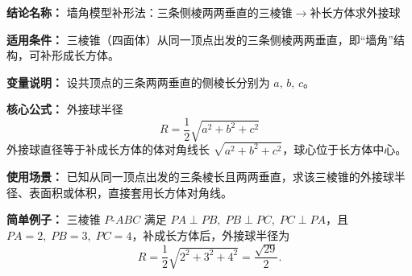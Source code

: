 \textbf{结论名称：} 墙角模型补形法：三条侧棱两两垂直的三棱锥$\rightarrow$补长方体求外接球

\textbf{适用条件：} 三棱锥（四面体）从同一顶点出发的三条侧棱两两垂直，即“墙角”结构，可补形成长方体。

\textbf{变量说明：} 设共顶点的三条两两垂直的侧棱长分别为 $a,\,b,\,c$。

\textbf{核心公式：} 外接球半径
\[
\boxed{R = \frac{1}{2}\sqrt{a^{2}+b^{2}+c^{2}}}
\]
外接球直径等于补成长方体的体对角线长 $\sqrt{a^{2}+b^{2}+c^{2}}$，球心位于长方体中心。

\textbf{使用场景：} 已知从同一顶点出发的三条棱长且两两垂直，求该三棱锥的外接球半径、表面积或体积，直接套用长方体对角线。

\textbf{简单例子：} 三棱锥 $P\text{-}ABC$ 满足 $PA\perp PB,\; PB\perp PC,\; PC\perp PA$，且 $PA=2,\; PB=3,\; PC=4$，补成长方体后，外接球半径为
\[
R = \frac{1}{2}\sqrt{2^{2}+3^{2}+4^{2}} = \frac{\sqrt{29}}{2}.
\]